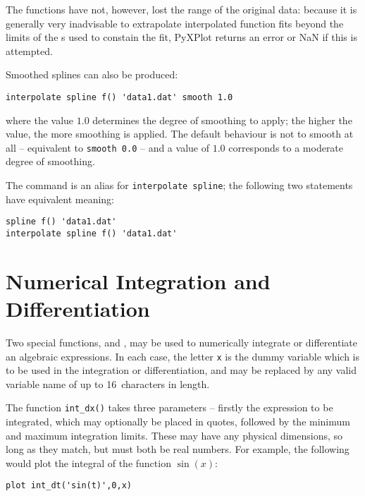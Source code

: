 The functions have not, however, lost the range of the original data: because
it is generally very inadvisable to extrapolate interpolated function fits
beyond the limits of the \datapoint s used to constain the fit, PyXPlot returns
an error or NaN if this is attempted.

Smoothed splines can also be produced:

\begin{verbatim}
interpolate spline f() 'data1.dat' smooth 1.0
\end{verbatim}

\noindent where the value $1.0$ determines the degree of smoothing to apply;
the higher the value, the more smoothing is applied. The default behaviour is
not to smooth at all -- equivalent to {\tt smooth 0.0} -- and a value of $1.0$
corresponds to a moderate degree of smoothing.

The  command is an alias for {\tt interpolate spline}; the
following two statements have equivalent meaning:

\begin{verbatim}
spline f() 'data1.dat'
interpolate spline f() 'data1.dat'
\end{verbatim}

\section{Numerical Integration and Differentiation}

 Two special functions,
 and , may be used to numerically
integrate or differentiate an algebraic expressions.  In each case, the letter
{\tt x} is the dummy variable which is to be used in the integration or
differentiation, and may be replaced by any valid variable name of up to
16~characters in length.

The function {\tt int\_dx()} takes three parameters -- firstly the expression
to be integrated, which may optionally be placed in quotes, followed by the
minimum and maximum integration limits. These may have any physical dimensions,
so long as they match, but must both be real numbers. For example, the
following would plot the integral of the function $\sin(x)$:

\begin{verbatim}
plot int_dt('sin(t)',0,x)
\end{verbatim} 


